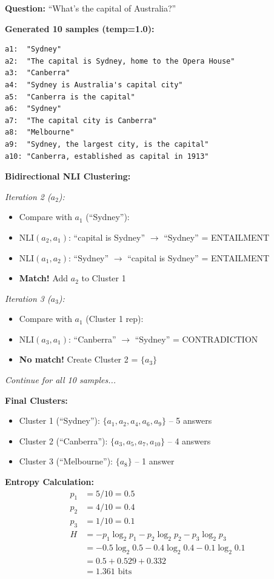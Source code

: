 \documentclass[12pt,a4paper]{article}
\theoremstyle{definition}
\begin{document}
\begin{examplebox}[title=Semantic Entropy Catches Confabulation]

\textbf{Question:} ``What's the capital of Australia?''

\textbf{Generated 10 samples (temp=1.0):}
\begin{verbatim}
a1:  "Sydney"
a2:  "The capital is Sydney, home to the Opera House"
a3:  "Canberra"
a4:  "Sydney is Australia's capital city"
a5:  "Canberra is the capital"
a6:  "Sydney"
a7:  "The capital city is Canberra"
a8:  "Melbourne"
a9:  "Sydney, the largest city, is the capital"
a10: "Canberra, established as capital in 1913"
\end{verbatim}

\textbf{Bidirectional NLI Clustering:}

\textit{Iteration 2 ($a_2$):}
\begin{itemize}
    \item Compare with $a_1$ (``Sydney''):
    \item $\text{NLI}(a_2, a_1)$: ``capital is Sydney'' $\rightarrow$ ``Sydney'' = ENTAILMENT
    \item $\text{NLI}(a_1, a_2)$: ``Sydney'' $\rightarrow$ ``capital is Sydney'' = ENTAILMENT
    \item \textbf{Match!} Add $a_2$ to Cluster 1
\end{itemize}

\textit{Iteration 3 ($a_3$):}
\begin{itemize}
    \item Compare with $a_1$ (Cluster 1 rep):
    \item $\text{NLI}(a_3, a_1)$: ``Canberra'' $\rightarrow$ ``Sydney'' = CONTRADICTION
    \item \textbf{No match!} Create Cluster 2 = $\{a_3\}$
\end{itemize}

\textit{Continue for all 10 samples...}

\textbf{Final Clusters:}
\begin{itemize}
    \item Cluster 1 (``Sydney''): $\{a_1, a_2, a_4, a_6, a_9\}$ -- 5 answers
    \item Cluster 2 (``Canberra''): $\{a_3, a_5, a_7, a_{10}\}$ -- 4 answers
    \item Cluster 3 (``Melbourne''): $\{a_8\}$ -- 1 answer
\end{itemize}

\textbf{Entropy Calculation:}
\begin{align}
p_1 &= 5/10 = 0.5 \\
p_2 &= 4/10 = 0.4 \\
p_3 &= 1/10 = 0.1 \\
H &= -p_1 \log_2 p_1 - p_2 \log_2 p_2 - p_3 \log_2 p_3 \\
&= -0.5 \log_2 0.5 - 0.4 \log_2 0.4 - 0.1 \log_2 0.1 \\
&= 0.5 + 0.529 + 0.332 \\
&= 1.361 \text{ bits}
\end{align}


\end{examplebox}
\end{document}
